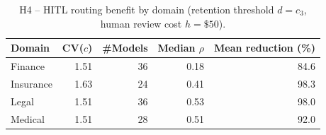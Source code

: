 \begin{table}[t]\centering\small
\caption{H4 -- HITL routing benefit by domain (retention threshold $d{=}c_3$,
human review cost $h{=}\$50$).}\label{tab:h4}
\begin{tabular}{lrrrr}
\toprule
Domain & CV($c$) & \#Models & Median $\rho$ & Mean reduction (\%) \\
\midrule
  Finance & 1.51 & 36 & 0.18 & 84.6 \\
  Insurance & 1.63 & 24 & 0.41 & 98.3 \\
  Legal & 1.51 & 36 & 0.53 & 98.0 \\
  Medical & 1.51 & 28 & 0.51 & 92.0 \\
\bottomrule
\end{tabular}
\end{table}